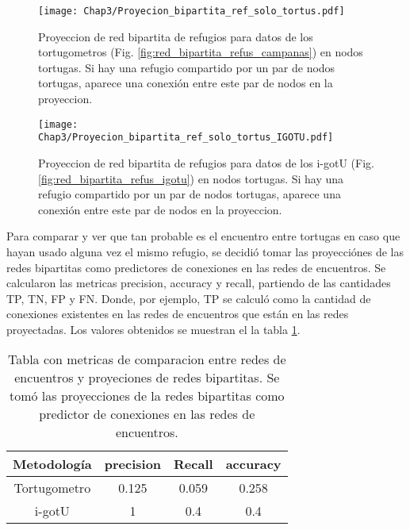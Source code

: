 \begin{figure}[ht]
    \begin{center}
        \texttt{[image: Chap3/Proyecion\_bipartita\_ref\_solo\_tortus.pdf]}
        \caption[Proyeccion  de red bipartita de refugios para datos de los tortugometros en nodos tortugas.]{Proyeccion  de red bipartita de refugios para datos de los tortugometros (Fig. \ref{fig:red_bipartita_refus_campanas}) en nodos tortugas. Si hay una refugio compartido por un par de nodos tortugas, aparece una conexión entre este par de nodos en la proyeccion. } 
        \label{fig:proyeccion_red_campanas}
        
        \end{center}
\end{figure} 

\begin{figure}[ht]
    \begin{center}
        \texttt{[image: Chap3/Proyecion\_bipartita\_ref\_solo\_tortus\_IGOTU.pdf]}
        \caption[Proyeccion  de red bipartita de refugios para datos de los tortugometros en nodos tortugas.]{Proyeccion  de red bipartita de refugios para datos de los i-gotU (Fig. \ref{fig:red_bipartita_refus_igotu}) en nodos tortugas. Si hay una refugio compartido por un par de nodos tortugas, aparece una conexión entre este par de nodos en la proyeccion. } 
        \label{fig:proyeccion_red_igotu}
        
        \end{center}
\end{figure} 
Para comparar y ver que tan probable es el encuentro entre tortugas en caso que hayan usado alguna vez el mismo refugio, se decidió tomar las proyecciónes de las redes bipartitas como predictores de conexiones en las redes de encuentros. Se calcularon las metricas precision, accuracy y recall, partiendo de las cantidades TP, TN, FP y FN. Donde, por ejemplo, TP se calculó como la cantidad de conexiones existentes en las redes de encuentros que están en las redes proyectadas. Los valores obtenidos se muestran el la tabla \ref{tab:metricas_comparacion_redes}.
\begin{table}[ht]
    \centering
    \begin{tabular}{|c|c|c|c|}
        
   \hline
    Metodología  & precision & Recall & accuracy \\ \hline
    Tortugometro & 0.125     & 0.059  & 0.258    \\ \hline
    i-gotU       & 1         & 0.4    & 0.4       \\ \hline
    
    \end{tabular}
    \caption[Tabla con metricas de comparacion entre redes de encuentros y proyeciones de redes bipartitas.]{Tabla con metricas de comparacion entre redes de encuentros y proyeciones de redes bipartitas. Se tomó las proyecciones de la redes bipartitas como predictor de conexiones en las redes de encuentros.}
    \label{tab:metricas_comparacion_redes}
\end{table}
